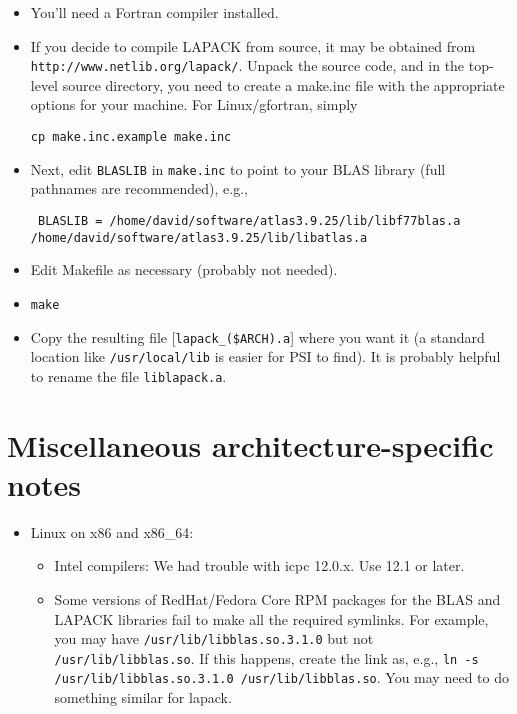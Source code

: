 \documentclass[12pt]{article}
\begin{document}
   \begin{itemize}

   \item
   You'll need a Fortran compiler installed.

   \item
   If you decide to compile LAPACK from source, it may be obtained from \\
   {\tt http://www.netlib.org/lapack/}.  Unpack the source code, and in the
   top-level source directory, you need to create a make.inc file with
   the appropriate options for your machine.  For Linux/gfortran,
   simply

     {\tt cp make.inc.example make.inc}

   \item
   Next, edit {\tt BLASLIB} in {\tt make.inc} to point to your BLAS library
   (full pathnames are recommended), e.g.,

     {\tt
     BLASLIB      = /home/david/software/atlas3.9.25/lib/libf77blas.a \\
/home/david/software/atlas3.9.25/lib/libatlas.a
     }

   \item
   Edit Makefile as necessary (probably not needed).

   \item {\tt make}

   \item
   Copy the resulting file [{\tt lapack\_(\$ARCH).a}] where you want it
   (a standard location like {\tt /usr/local/lib} is easier for PSI to find).
   It is probably helpful to rename the file {\tt liblapack.a}.

   \end{itemize}


\section{Miscellaneous architecture-specific notes}
\begin{itemize}

\item Linux on x86 and x86\_64:
  \begin{itemize}
   \item Intel compilers: We had trouble with icpc 12.0.x.  Use 12.1 or later.
   \item Some versions of RedHat/Fedora Core RPM packages for the 
   BLAS and LAPACK libraries fail to make all the required symlinks.  
   For example, you may have {\tt /usr/lib/libblas.so.3.1.0} but not
   {\tt /usr/lib/libblas.so}.  If this happens, create the link as, e.g.,
   {\tt ln -s /usr/lib/libblas.so.3.1.0 /usr/lib/libblas.so}.  You
   may need to do something similar for lapack.
  \end{itemize}
\end{itemize}
\end{document}
